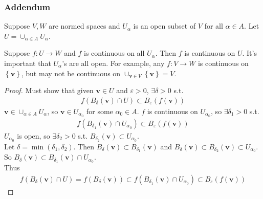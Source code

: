 \documentclass[a4paper]{article}
\begin{document}
\subsubsection{Addendum}
Suppose $V,W$ are normed spaces and $U_\alpha$ is an open subset of $V$ for all $\alpha \in A$. Let $U = \cup_{\alpha \in A} U_\alpha$.

\begin{prop}
Suppose $f:U \to W$ and $f$ is continuous on all $U_\alpha$. Then $f$ is continuous on $U$.
It's important that $U_\alpha$'s are all open. For example, any $f:V\to W$ is continuous on $\left\{\mathbf{v}\right\}$, but may not be continuous on $\cup_{\mathbf{v} \in V} \left\{\mathbf{v}\right\} = V$.
\begin{proof}
Must show that given $\mathbf{v} \in U$ and $\varepsilon > 0$, $\exists \delta>0$ s.t.
\begin{equation*}
\begin{aligned}
f\left(B_\delta\left(\mathbf{v}\right) \cap U\right) \subset B_\varepsilon\left(f\left(\mathbf{v}\right)\right)
\end{aligned}
\end{equation*}
$\mathbf{v} \in \cup_{\alpha \in A} U_\alpha$, so $\mathbf{v} \in U_{\alpha_0}$ for some $\alpha_0 \in A$. $f$ is continuous on $U_{\alpha_0}$, so $\exists \delta_1 > 0$ s.t.
\begin{equation*}
\begin{aligned}
f\left(B_{\delta_1}\left(\mathbf{v}\right) \cap U_{\alpha_0}\right) \subset B_\varepsilon\left(f\left(\mathbf{v}\right)\right)
\end{aligned}
\end{equation*}
$U_{\alpha_0}$ is open, so $\exists \delta_2 > 0$ s.t. $B_{\delta_2}\left(\mathbf{v}\right) \subset U_{\alpha_0}$.\\
Let $\delta = \min\left(\delta_1,\delta_2\right)$. Then $B_\delta\left(\mathbf{v}\right) \subset B_{\delta_1} \left(\mathbf{v}\right)$ and $B_\delta\left(\mathbf{v}\right) \subset B_{\delta_2}\left(\mathbf{v}\right) \subset U_{\alpha_0}$. \\
So $B_\delta\left(\mathbf{v}\right) \subset B_{\delta_1}\left(\mathbf{v}\right)\cap U_{\alpha_0}$.\\
Thus
\begin{equation*}
\begin{aligned}
f\left(B_\delta\left(\mathbf{v}\right)\cap U\right) = f\left(B_\delta\left(\mathbf{v}\right)\right) \subset f\left(B_{\delta_1} \left(\mathbf{v}\right) \cap U_{\alpha_0}\right) \subset B_\varepsilon\left(f\left(\mathbf{v}\right)\right)
\end{aligned}
\end{equation*}
\end{proof}
\end{prop}
\end{document}
